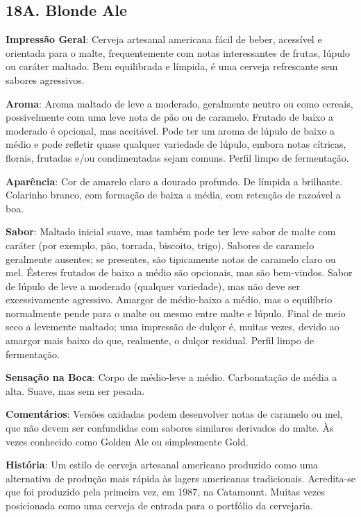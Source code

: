 \subsection*{18A. Blonde Ale}
\textbf{Impressão Geral}: Cerveja artesanal americana fácil de beber, acessível e orientada para o malte, frequentemente com notas interessantes de frutas, lúpulo ou caráter maltado. Bem equilibrada e límpida, é uma cerveja refrescante sem sabores agressivos.

\textbf{Aroma}: Aroma maltado de leve a moderado, geralmente neutro ou como cereais, possivelmente com uma leve nota de pão ou de caramelo. Frutado de baixo a moderado é opcional, mas aceitável. Pode ter um aroma de lúpulo de baixo a médio e pode refletir quase qualquer variedade de lúpulo, embora notas cítricas, florais, frutadas e/ou condimentadas sejam comuns. Perfil limpo de fermentação.

\textbf{Aparência}: Cor de amarelo claro a dourado profundo. De límpida a brilhante. Colarinho branco, com formação de baixa a média, com retenção de razoável a boa.

\textbf{Sabor}: Maltado inicial suave, mas também pode ter leve sabor de malte com caráter (por exemplo, pão, torrada, biscoito, trigo). Sabores de caramelo geralmente ausentes; se presentes, são tipicamente notas de caramelo claro ou mel. Ésteres frutados de baixo a médio são opcionais, mas são bem-vindos. Sabor de lúpulo de leve a moderado (qualquer variedade), mas não deve ser excessivamente agressivo. Amargor de médio-baixo a médio, mas o equilíbrio normalmente pende para o malte ou mesmo entre malte e lúpulo. Final de meio seco a levemente maltado; uma impressão de dulçor é, muitas vezes, devido ao amargor mais baixo do que, realmente, o dulçor residual. Perfil limpo de fermentação.

\textbf{Sensação na Boca}: Corpo de médio-leve a médio. Carbonatação de média a alta. Suave, mas sem ser pesada.

\textbf{Comentários}: Versões oxidadas podem desenvolver notas de caramelo ou mel, que não devem ser confundidas com sabores similares derivados do malte. Às vezes conhecido como Golden Ale ou simplesmente Gold.

\textbf{História}: Um estilo de cerveja artesanal americano produzido como uma alternativa de produção mais rápida às lagers americanas tradicionais. Acredita-se que foi produzido pela primeira vez, em 1987, na Catamount. Muitas vezes posicionada como uma cerveja de entrada para o portfólio da cervejaria.

